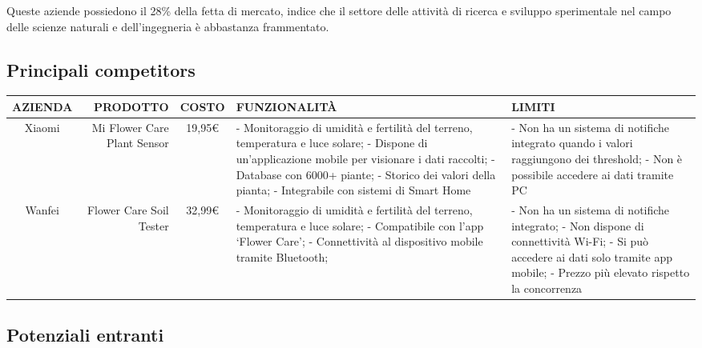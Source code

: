 Queste aziende possiedono il 28\% della fetta di mercato, indice che il settore delle attività di ricerca e sviluppo sperimentale nel campo delle scienze naturali e dell’ingegneria è abbastanza frammentato.

\subsection{Principali competitors}
\begin{center}
\begin{tabularx}{\textwidth}{| S | D | S | L | L |}
  \hline
  \textbf{AZIENDA} &
  \textbf{PRODOTTO} &
  \textbf{COSTO} &
  \textbf{FUNZIONALIT\`A} &
  \textbf{LIMITI} \\	
  \hline
 Xiaomi & Mi Flower Care Plant Sensor & 19,95€ &
- Monitoraggio di umidità e fertilità del terreno, temperatura e luce solare;\newline
- Dispone di un’applicazione mobile per visionare i dati raccolti;\newline
- Database con 6000+ piante;\newline
- Storico dei valori della pianta;\newline
- Integrabile con sistemi di Smart Home & 
- Non ha un sistema di notifiche integrato quando i valori raggiungono dei threshold;\newline
- Non è possibile accedere ai dati tramite PC \\	\hline
 Wanfei & Flower Care Soil Tester & 32,99€ &
- Monitoraggio di umidità e fertilità del terreno, temperatura e luce solare;\newline
- Compatibile con l’app ‘Flower Care’;\newline
- Connettività al dispositivo mobile tramite Bluetooth; &
- Non ha un sistema di notifiche integrato;\newline
- Non dispone di connettività Wi-Fi;\newline
- Si può accedere ai dati solo tramite app mobile;\newline
- Prezzo più elevato rispetto la concorrenza \\	\hline
\end{tabularx}
\end{center}

\subsection{Potenziali entranti}

